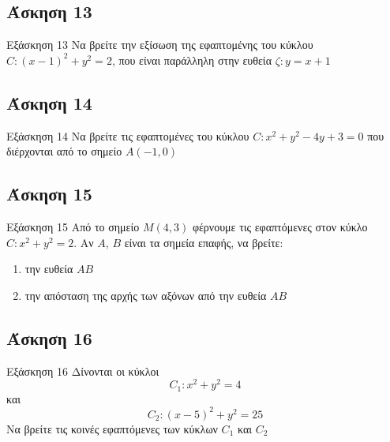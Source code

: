 \documentclass[greek]{beamer}
\begin{document}
\subsection{Άσκηση 13}
\begin{frame}[label=Άσκηση13,t]{Εξάσκηση 13}
  Να βρείτε την εξίσωση της εφαπτομένης του κύκλου $C:(x-1)^2+y^2=2$, που είναι παράλληλη στην ευθεία $ζ:y=x+1$

\end{frame}

\subsection{Άσκηση 14}
\begin{frame}[label=Άσκηση14,t]{Εξάσκηση 14}
  Να βρείτε τις εφαπτομένες του κύκλου $C:x^2+y^2-4y+3=0$ που διέρχονται από το σημείο $Α(-1,0)$

\end{frame}

\subsection{Άσκηση 15}
\begin{frame}[label=Άσκηση15,t]{Εξάσκηση 15}
  Από το σημείο $Μ(4,3)$ φέρνουμε τις εφαπτόμενες στον κύκλο $C:x^2+y^2=2$. Αν $Α$, $Β$ είναι τα σημεία επαφής, να βρείτε:
  \begin{enumerate}
    \item<1-> την ευθεία $ΑΒ$
    \item<2-> την απόσταση της αρχής των αξόνων από την ευθεία $ΑΒ$
  \end{enumerate}

\end{frame}

\subsection{Άσκηση 16}
\begin{frame}[label=Άσκηση16,t]{Εξάσκηση 16}
  Δίνονται οι κύκλοι
  $$C_1:x^2+y^2=4$$
  και
  $$C_2:(x-5)^2+y^2=25$$
  Να βρείτε τις κοινές εφαπτόμενες των κύκλων $C_1$ και $C_2$

\end{frame}
\end{document}
